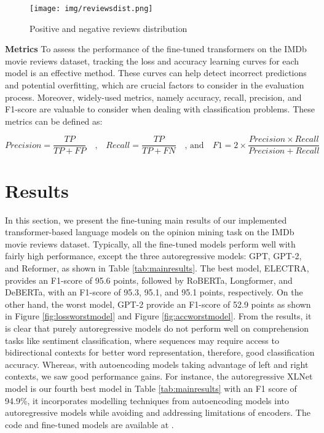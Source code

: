 \documentclass{article}
\begin{document}
\begin{figure}[!ht]
\centering
  \texttt{[image: img/reviewsdist.png]}
      \vspace{.3em}
 \caption{Positive and negative reviews distribution}
  \label{fig:reviewsdist}
\end{figure}


\textbf{Metrics} To assess the performance of the fine-tuned transformers on the IMDb movie reviews dataset, tracking the loss and accuracy learning curves for each model is an effective method. These curves can help detect incorrect predictions and potential overfitting, which are crucial factors to consider in the evaluation process. Moreover, widely-used metrics, namely accuracy, recall, precision, and F1-score are valuable to consider when dealing with classification problems. These metrics can be defined as:

\begin{equation}
   Precision = \frac{TP}{TP+FP}
   \quad\text{,}
   \quad
   Recall = \frac{TP}{TP+FN}
   \quad\text{, and}
   \quad
   F1= 2\times\frac{Precision \times Recall}{Precision + Recall}
\end{equation}

\section{Results}
In this section, we present the fine-tuning main results of our implemented transformer-based language models on the opinion mining task on the IMDb movie reviews dataset. Typically, all the fine-tuned models perform well with fairly high performance, except the three autoregressive models: GPT, GPT-2, and Reformer, as shown in Table \ref{tab:mainresults}. The best model, ELECTRA, provides an F1-score of 95.6 points, followed by RoBERTa, Longformer, and DeBERTa, with an F1-score of 95.3, 95.1, and 95.1 points, respectively. On the other hand, the worst model, GPT-2 provide an F1-score of 52.9 points as shown in Figure \ref{fig:lossworstmodel} and \linebreak Figure  \ref{fig:accworstmodel}. From the results, it is clear that purely autoregressive models do not perform well on comprehension tasks like sentiment classification, where sequences may require access to bidirectional contexts for better word representation, therefore, good classification accuracy. Whereas, with autoencoding models taking advantage of left and right contexts, we saw good performance gains. For instance, the autoregressive XLNet model is our fourth best model in Table \ref{tab:mainresults} with an F1 score of 94.9\%, it incorporates modelling techniques from autoencoding models into autoregressive models while avoiding and addressing limitations of encoders. The code and fine-tuned models are available at \cite{opinion2023zekaoui}.
\end{document}
